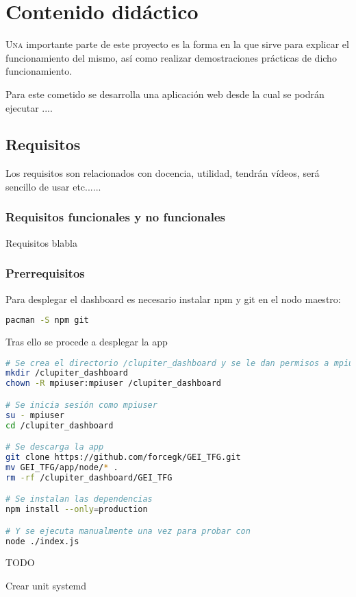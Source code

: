 \chapter{Contenido didáctico}
\label{chap:contenido_didactico}

\lettrine{U}{na} importante parte de este proyecto es la forma en la que sirve para explicar el funcionamiento del mismo, así como realizar demostraciones prácticas de dicho funcionamiento.

Para este cometido se desarrolla una aplicación web desde la cual se podrán ejecutar ....

\section{Requisitos}
Los requisitos son relacionados con docencia, utilidad, tendrán vídeos, será sencillo de usar etc......

\subsection{Requisitos funcionales y no funcionales}
Requisitos blabla

\subsection{Prerrequisitos}
Para desplegar el dashboard es necesario instalar npm y git en el nodo maestro:
\begin{lstlisting}[language=bash]
pacman -S npm git
\end{lstlisting}

Tras ello se procede a desplegar la app
\begin{lstlisting}[language=bash]
# Se crea el directorio /clupiter_dashboard y se le dan permisos a mpiuser
mkdir /clupiter_dashboard
chown -R mpiuser:mpiuser /clupiter_dashboard

# Se inicia sesión como mpiuser
su - mpiuser
cd /clupiter_dashboard

# Se descarga la app
git clone https://github.com/forcegk/GEI_TFG.git
mv GEI_TFG/app/node/* .
rm -rf /clupiter_dashboard/GEI_TFG

# Se instalan las dependencias
npm install --only=production

# Y se ejecuta manualmente una vez para probar con
node ./index.js
\end{lstlisting}

TODO

Crear unit systemd

